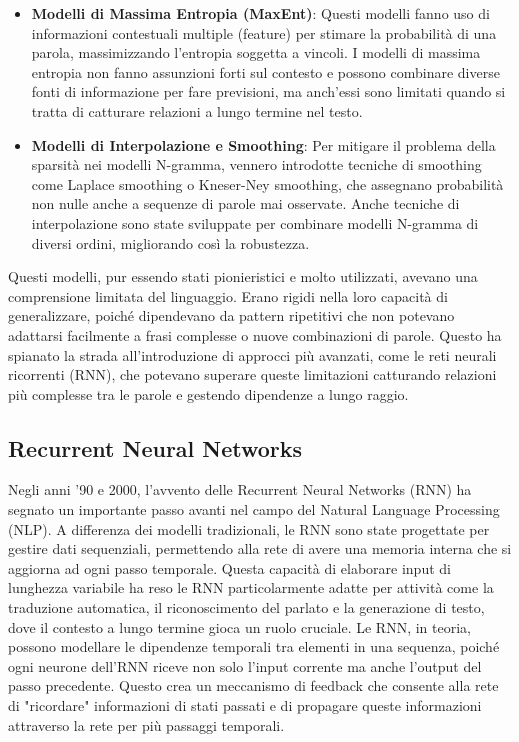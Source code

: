\begin{itemize}
	\item \textbf{Modelli di Massima Entropia (MaxEnt)}: Questi modelli fanno uso di informazioni contestuali multiple (feature) per stimare la probabilità di una parola, massimizzando l'entropia soggetta a vincoli. I modelli di massima entropia non fanno assunzioni forti sul contesto e possono combinare diverse fonti di informazione per fare previsioni, ma anch'essi sono limitati quando si tratta di catturare relazioni a lungo termine nel testo.
	\item \textbf{Modelli di Interpolazione e Smoothing}: Per mitigare il problema della sparsità nei modelli N-gramma, vennero introdotte tecniche di smoothing come Laplace smoothing o Kneser-Ney smoothing, che assegnano probabilità non nulle anche a sequenze di parole mai osservate. Anche tecniche di interpolazione sono state sviluppate per combinare modelli N-gramma di diversi ordini, migliorando così la robustezza.
\end{itemize}
Questi modelli, pur essendo stati pionieristici e molto utilizzati, avevano una comprensione limitata del linguaggio. Erano rigidi nella loro capacità di generalizzare, poiché dipendevano da pattern ripetitivi che non potevano adattarsi facilmente a frasi complesse o nuove combinazioni di parole. Questo ha spianato la strada all'introduzione di approcci più avanzati, come le reti neurali ricorrenti (RNN), che potevano superare queste limitazioni catturando relazioni più complesse tra le parole e gestendo dipendenze a lungo raggio.

\subsection{Recurrent Neural Networks}
Negli anni '90 e 2000, l'avvento delle Recurrent Neural Networks (RNN) ha segnato un importante passo avanti nel campo del Natural Language Processing (NLP). A differenza dei modelli tradizionali, le RNN sono state progettate per gestire dati sequenziali, permettendo alla rete di avere una memoria interna che si aggiorna ad ogni passo temporale. Questa capacità di elaborare input di lunghezza variabile ha reso le RNN particolarmente adatte per attività come la traduzione automatica, il riconoscimento del parlato e la generazione di testo, dove il contesto a lungo termine gioca un ruolo cruciale.
Le RNN, in teoria, possono modellare le dipendenze temporali tra elementi in una sequenza, poiché ogni neurone dell'RNN riceve non solo l'input corrente ma anche l'output del passo precedente. Questo crea un meccanismo di feedback che consente alla rete di "ricordare" informazioni di stati passati e di propagare queste informazioni attraverso la rete per più passaggi temporali.

